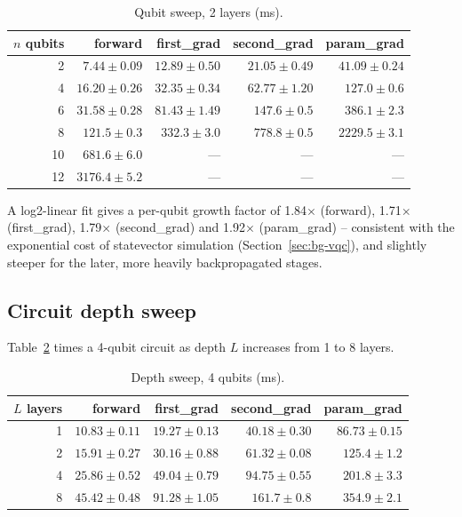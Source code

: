 \begin{table}[h]
\centering
\caption{Qubit sweep, 2 layers (ms).}
\label{tab:qubit-sweep}
\small
\begin{tabular}{@{}rrrrr@{}}
\toprule
$n$ qubits & forward & first\_grad & second\_grad & param\_grad \\
\midrule
2  & $7.44\pm0.09$   & $12.89\pm0.50$  & $21.05\pm0.49$  & $41.09\pm0.24$ \\
4  & $16.20\pm0.26$  & $32.35\pm0.34$  & $62.77\pm1.20$  & $127.0\pm0.6$ \\
6  & $31.58\pm0.28$  & $81.43\pm1.49$  & $147.6\pm0.5$   & $386.1\pm2.3$ \\
8  & $121.5\pm0.3$   & $332.3\pm3.0$   & $778.8\pm0.5$   & $2229.5\pm3.1$ \\
10 & $681.6\pm6.0$   & ---             & ---             & --- \\
12 & $3176.4\pm5.2$  & ---             & ---             & --- \\
\bottomrule
\end{tabular}
\end{table}

A log2-linear fit gives a per-qubit growth factor of 1.84$\times$ (forward), 1.71$\times$ (first\_grad),
1.79$\times$ (second\_grad) and 1.92$\times$ (param\_grad) -- consistent with the exponential cost of
statevector simulation (Section~\ref{sec:bg-vqc}), and slightly steeper for the later, more heavily
backpropagated stages.

\subsection{Circuit depth sweep}
\label{sec:res-depth}
Table~\ref{tab:depth-sweep} times a 4-qubit circuit as depth $L$ increases from 1 to 8 layers.

\begin{table}[h]
\centering
\caption{Depth sweep, 4 qubits (ms).}
\label{tab:depth-sweep}
\small
\begin{tabular}{@{}rrrrr@{}}
\toprule
$L$ layers & forward & first\_grad & second\_grad & param\_grad \\
\midrule
1 & $10.83\pm0.11$ & $19.27\pm0.13$ & $40.18\pm0.30$  & $86.73\pm0.15$ \\
2 & $15.91\pm0.27$ & $30.16\pm0.88$ & $61.32\pm0.08$  & $125.4\pm1.2$ \\
4 & $25.86\pm0.52$ & $49.04\pm0.79$ & $94.75\pm0.55$  & $201.8\pm3.3$ \\
8 & $45.42\pm0.48$ & $91.28\pm1.05$ & $161.7\pm0.8$   & $354.9\pm2.1$ \\
\bottomrule
\end{tabular}
\end{table}

